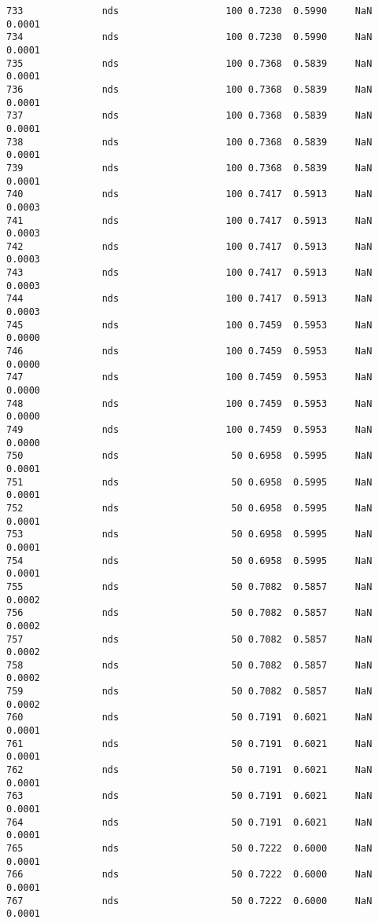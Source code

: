 \documentclass[11pt]{article}
\begin{document}
\begin{Verbatim}[commandchars=\\\{\}]
733              nds                   100 0.7230  0.5990     NaN 0.0001   
734              nds                   100 0.7230  0.5990     NaN 0.0001   
735              nds                   100 0.7368  0.5839     NaN 0.0001   
736              nds                   100 0.7368  0.5839     NaN 0.0001   
737              nds                   100 0.7368  0.5839     NaN 0.0001   
738              nds                   100 0.7368  0.5839     NaN 0.0001   
739              nds                   100 0.7368  0.5839     NaN 0.0001   
740              nds                   100 0.7417  0.5913     NaN 0.0003   
741              nds                   100 0.7417  0.5913     NaN 0.0003   
742              nds                   100 0.7417  0.5913     NaN 0.0003   
743              nds                   100 0.7417  0.5913     NaN 0.0003   
744              nds                   100 0.7417  0.5913     NaN 0.0003   
745              nds                   100 0.7459  0.5953     NaN 0.0000   
746              nds                   100 0.7459  0.5953     NaN 0.0000   
747              nds                   100 0.7459  0.5953     NaN 0.0000   
748              nds                   100 0.7459  0.5953     NaN 0.0000   
749              nds                   100 0.7459  0.5953     NaN 0.0000   
750              nds                    50 0.6958  0.5995     NaN 0.0001   
751              nds                    50 0.6958  0.5995     NaN 0.0001   
752              nds                    50 0.6958  0.5995     NaN 0.0001   
753              nds                    50 0.6958  0.5995     NaN 0.0001   
754              nds                    50 0.6958  0.5995     NaN 0.0001   
755              nds                    50 0.7082  0.5857     NaN 0.0002   
756              nds                    50 0.7082  0.5857     NaN 0.0002   
757              nds                    50 0.7082  0.5857     NaN 0.0002   
758              nds                    50 0.7082  0.5857     NaN 0.0002   
759              nds                    50 0.7082  0.5857     NaN 0.0002   
760              nds                    50 0.7191  0.6021     NaN 0.0001   
761              nds                    50 0.7191  0.6021     NaN 0.0001   
762              nds                    50 0.7191  0.6021     NaN 0.0001   
763              nds                    50 0.7191  0.6021     NaN 0.0001   
764              nds                    50 0.7191  0.6021     NaN 0.0001   
765              nds                    50 0.7222  0.6000     NaN 0.0001   
766              nds                    50 0.7222  0.6000     NaN 0.0001   
767              nds                    50 0.7222  0.6000     NaN 0.0001   

\end{Verbatim}
\end{document}
